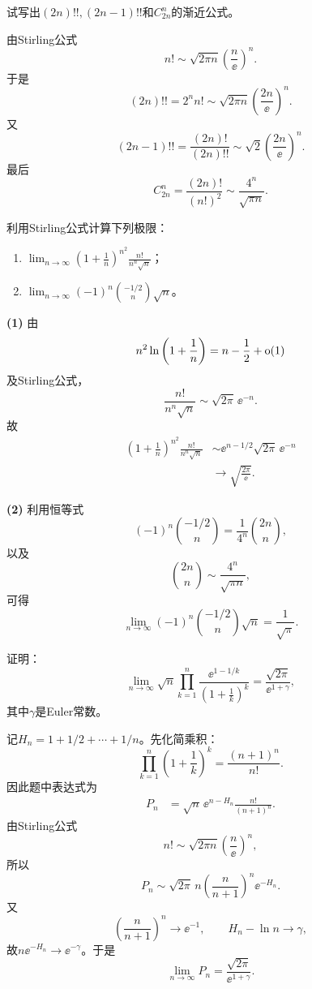 \begin{xexercise}[8]
试写出$(2n)!!,(2n-1)!!$和$C_{2n}^n$的渐近公式。
\end{xexercise}
\begin{xsolution}
由Stirling公式
\[
 n!\sim\sqrt{2\pi n}\left(\frac n\ee\right)^n.
\]
于是
\[
 (2n)!!=2^nn!
 \sim\boxed{\sqrt{2\pi n}\left(\frac{2n}{\ee}\right)^n}.
\]
又
\[
 (2n-1)!!=\frac{(2n)!}{(2n)!!}
 \sim\boxed{\sqrt2\left(\frac{2n}{\ee}\right)^n}.
\]
最后
\[
 C_{2n}^n=\frac{(2n)!}{(n!)^2}
 \sim\boxed{\frac{4^n}{\sqrt{\pi n}}}.
\]
\end{xsolution}


\begin{xexercise}[9]
利用Stirling公式计算下列极限：
  \begin{enumerate}[label=(\arabic*)]
    \item $\displaystyle\lim_{n\to\infty}\left(1+\frac1n\right)^{n^2}\frac{n!}{n^n\sqrt n}$；
    \item $\displaystyle\lim_{n\to\infty}(-1)^n\binom{-1/2}{n}\sqrt n$。
  \end{enumerate}
\end{xexercise}
\begin{xsolution}
\textbf{(1)}\quad
由
\[
 n^2\ln\left(1+\frac1n\right)
 =n-\frac12+\mathrm{o}(1)
\]
及Stirling公式，
\[
 \frac{n!}{n^n\sqrt n}
 \sim\sqrt{2\pi}\,\ee^{-n}.
\]
故
\begin{align*}
\left(1+\frac1n\right)^{n^2}\frac{n!}{n^n\sqrt n}
&\sim \ee^{n-1/2}\sqrt{2\pi}\,\ee^{-n}\\
&\longrightarrow\boxed{\sqrt{\frac{2\pi}{\ee}}}.
\end{align*}

\textbf{(2)}\quad
利用恒等式
\[
 (-1)^n\binom{-1/2}{n}=\frac1{4^n}\binom{2n}{n},
\]
以及
\[
 \binom{2n}{n}\sim\frac{4^n}{\sqrt{\pi n}},
\]
可得
\[
 \boxed{\lim_{n\to\infty}(-1)^n\binom{-1/2}{n}\sqrt n
 =\frac1{\sqrt\pi}}.
\]
\end{xsolution}


\begin{xexercise}[10]
证明：
  \[
    \lim_{n\to\infty}\sqrt n\prod_{k=1}^n
    \frac{\ee^{1-1/k}}{\left(1+\frac1k\right)^k}
    =\frac{\sqrt{2\pi}}{\ee^{1+\gamma}},
  \]
  其中$\gamma$是Euler常数。
\end{xexercise}
\begin{xsolution}
记$H_n=1+1/2+\cdots+1/n$。先化简乘积：
\[
 \prod_{k=1}^n\left(1+\frac1k\right)^k
 =\frac{(n+1)^n}{n!}.
\]
因此题中表达式为
\begin{align*}
P_n
&=\sqrt n\,\ee^{n-H_n}\frac{n!}{(n+1)^n}.
\end{align*}
由Stirling公式
\[
 n!\sim\sqrt{2\pi n}\left(\frac n\ee\right)^n,
\]
所以
\[
 P_n\sim\sqrt{2\pi}\,n
 \left(\frac n{n+1}\right)^n\ee^{-H_n}.
\]
又
\[
 \left(\frac n{n+1}\right)^n\to\ee^{-1},
 \qquad H_n-\ln n\to\gamma,
\]
故$n\ee^{-H_n}\to\ee^{-\gamma}$。于是
\[
 \boxed{\lim_{n\to\infty}P_n
 =\frac{\sqrt{2\pi}}{\ee^{1+\gamma}}}.
\]
\end{xsolution}


